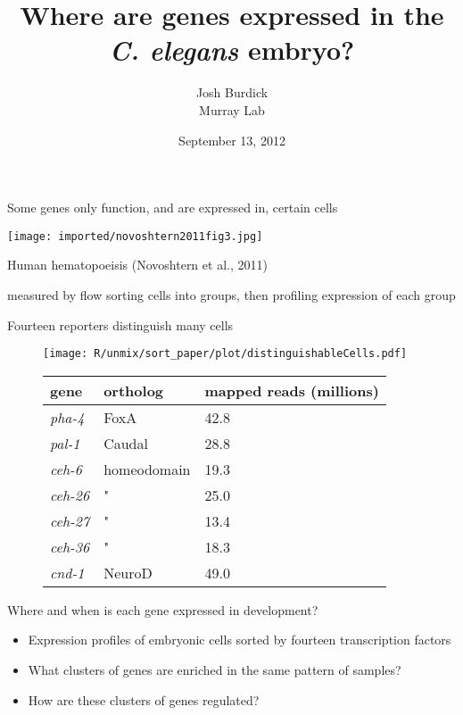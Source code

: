 \documentclass[serif,9pt]{beamer}
\title{Where are genes expressed in the {\em C. elegans} embryo?}
\author{Josh Burdick \\ Murray Lab}
\date{September 13, 2012}
\begin{document}
\begin{frame}
\titlepage
\end{frame}

\begin{frame}{Some genes only function, and are expressed in, certain cells}

\texttt{[image: imported/novoshtern2011fig3.jpg]}

Human hematopoeisis (Novoshtern et al., 2011)

{\small measured by flow sorting cells into groups, then profiling expression of each group}

\end{frame}

\begin{frame}{Fourteen reporters distinguish many cells}

\begin{figure}
\begin{centering}
\texttt{[image: R/unmix/sort\_paper/plot/distinguishableCells.pdf]}

{\small
\begin{tabular}{lll}
gene & ortholog & mapped reads (millions) \\
\hline
{\em pha-4} & FoxA & 42.8 \\
{\em pal-1} & Caudal & 28.8 \\
{\em ceh-6} & homeodomain & 19.3 \\
{\em ceh-26} & " & 25.0 \\
{\em ceh-27} & " & 13.4\\
{\em ceh-36} & " & 18.3 \\
{\em cnd-1} & NeuroD & 49.0 \\
\end{tabular}
}
\end{centering}
\end{figure}

\end{frame}

\begin{frame}{Where and when is each gene expressed in development?}

\begin{itemize}

\item Expression profiles of embryonic cells sorted by
fourteen transcription factors

\item What clusters of genes are enriched in the same pattern of samples?

\item How are these clusters of genes regulated?

\end{itemize}

\end{frame}
\end{document}
